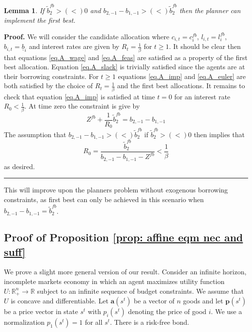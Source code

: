 \documentclass[thmsb,11pt]{article}
\newtheorem{lemma}{Lemma}
\newenvironment{proof}[1][Proof]{\noindent \textbf{#1.} }{\  \rule{0.5em}{0.5em}}
\begin{document}
\begin{lemma}  If $\tilde b_2^{fb}>(<)0$ and $b_{2,-1}-b_{1,-1} > (<) \tilde b_2^{fb}$ then the planner can implement the first best.
\end{lemma}
\begin{proof}
We will consider the candidate allocation where $c_{i,t} = c^{fb}_i$, $l_{i,t} = l^{fb}_i$, $b_{i,t} = \underline b_i$ and interest rates are given by $R_t = \frac 1{\beta}$ for $t\geq 1$.  It should be clear then that equations \eqref{eq.A_wage} and \eqref{eq.A_feas} are satisfied as a property of the first best allocation.  Equation \eqref{eq.A_slack} is trivially satisfied since the agents are at their borrowing constraints.  For $t\geq 1$ equations \eqref{eq.A_imp} and \eqref{eq.A_euler} are both satisfied by the choice of $R_t = \frac1\beta$ and the first best allocations.  It remains to check that equation \eqref{eq.A_imp} is satisfied at time $t=0$ for an interest rate $R_0 <\frac1\beta$.  At time zero the constraint is give by
\begin{equation}
	Z^{fb} + \frac 1{R_0} \tilde b^{fb}_2 = b_{2,-1}-b_{1,-1}
\end{equation}  The assumption that $b_{2,-1}-b_{1,-1} > (<) \tilde b_2^{fb}$ if  $\tilde b_2^{fb}>(<)0$ then implies that
\[
	R_ 0 = \frac{\tilde b^{fb}_2}{b_{2,-1}-b_{1,-1}- Z^{fb}} <\frac 1\beta
\] as desired.
\end{proof}

This will improve upon the planners problem without exogenous borrowing constraints, as first best can only be achieved in this scenario when $b_{2,-1}-b_{1,-1} = \tilde b_2^{fb}$.

\subsection{\smallskip Proof of Proposition  \ref{prop: affine eqm nec and suff}}
\label{appndx: affine eqm nec and stuff}
\smallskip

We prove a slight more general version of our result. Consider an infinite
horizon, incomplete markets economy in which an agent maximizes utility
function $U:\mathbb{R}_{+}^{n}\rightarrow \mathbb{R}$ subject to an infinite
sequence of budget constraints. We assume that $U$ is concave and
differentiable. Let $\bm{a}(s^t)$ be a vector of $n$ goods and let $%
\bm{p}(s^{t})$ be a price vector in state $s^{t}$ with $p_{i}(s^{t})$
denoting the price of good $i.$ We use a normalization $p_{1}\left(
s^{t}\right) =1$ for all $s^{t}.$ There is a risk-free bond.
\end{document}

